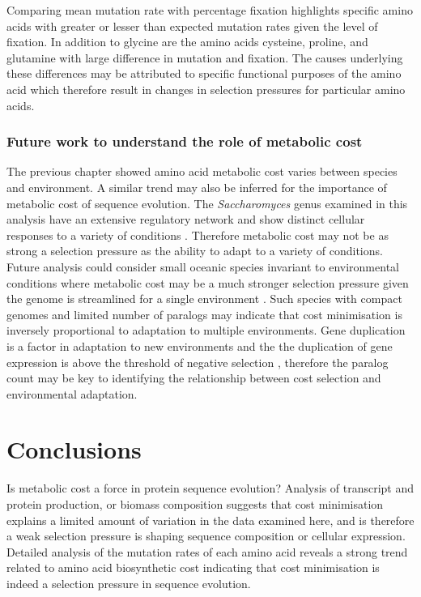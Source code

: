 Comparing mean mutation rate with percentage fixation highlights specific amino acids with greater or lesser than expected mutation rates given the level of fixation. In addition to glycine are the amino acids cysteine, proline, and glutamine with large difference in mutation and fixation. The causes underlying these differences may be attributed to specific functional purposes of the amino acid which therefore result in changes in selection pressures for particular amino acids.

\subsubsection{Future work to understand the role of metabolic cost}

The previous chapter showed amino acid metabolic cost varies between species and environment. A similar trend may also be inferred for the importance of metabolic cost of sequence evolution. The \emph{Saccharomyces} genus examined in this analysis have an extensive regulatory network and show distinct cellular responses to a variety of conditions \cite{castrillo2007}. Therefore metabolic cost may not be as strong a selection pressure as the ability to adapt to a variety of conditions. Future analysis could consider small oceanic species invariant to environmental conditions where metabolic cost may be a much stronger selection pressure given the genome is streamlined for a single environment \cite{peligabacter}. Such species with compact genomes and limited number of paralogs may indicate that cost minimisation is inversely proportional to adaptation to multiple environments. Gene duplication is a factor in adaptation to new environments \cite{ryan,envirologs} and the the duplication of gene expression is above the threshold of negative selection \cite{swire2007}, therefore the paralog count may be key to identifying the relationship between cost selection and environmental adaptation.


\section{Conclusions}

Is metabolic cost a force in protein sequence evolution? Analysis of transcript and protein production, or biomass composition suggests that cost minimisation explains a limited amount of variation in the data examined here, and is therefore a weak selection pressure is shaping sequence composition or cellular expression. Detailed analysis of the mutation rates of each amino acid reveals a strong trend related to amino acid biosynthetic cost indicating that cost minimisation is indeed a selection pressure in sequence evolution.
